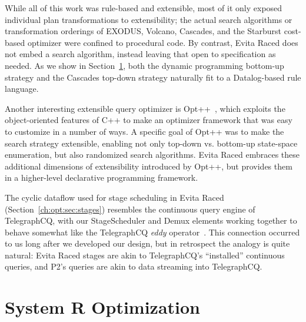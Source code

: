 While all of this work was rule-based and extensible, most of it only exposed
individual plan transformations to extensibility; the actual search algorithms
or transformation orderings of EXODUS, Volcano, Cascades, and the Starburst
cost-based optimizer were confined to procedural code.  By contrast, Evita Raced
does not embed a search algorithm, instead leaving that open to specification
as needed.  As we show in Section~\ref{ch:opt:sec:systemr}, both the dynamic programming
bottom-up strategy and the Cascades top-down strategy naturally fit to a
Datalog-based rule language.

Another interesting extensible query optimizer is Opt++~\cite{kabradewitt},
which exploits the object-oriented features of C++ to make an optimizer
framework that was easy to customize in a number of ways.  A specific goal of
Opt++ was to make the search strategy extensible, enabling not only top-down
vs.  bottom-up state-space enumeration, but also randomized search algorithms.
Evita Raced embraces these additional dimensions of extensibility introduced by
Opt++, but provides them in a higher-level declarative programming framework.

The cyclic dataflow used for stage scheduling in Evita Raced
(Section~\ref{ch:opt:sec:stages}) resembles the continuous query engine of
TelegraphCQ, with our StageScheduler and Demux elements working together to
behave somewhat like the TelegraphCQ {\em eddy} operator~\cite{tcq-cidr}.  This
connection occurred to us long after we developed our design, but in retrospect
the analogy is quite natural: Evita Raced stages are akin to TelegraphCQ's
``installed'' continuous queries, and P2's \OVERLOG queries are akin to data
streaming into TelegraphCQ.


\section{System R Optimization}
\label{ch:opt:sec:systemr}

